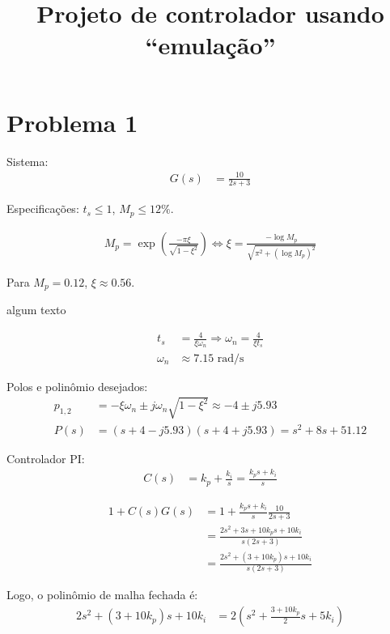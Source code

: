 \documentclass[12pt, a4paper]{article}
\title{Projeto de controlador usando ``emulação''}
\date{}
\begin{document}
	\maketitle

\section{Problema 1}

\newcommand{\Z}[1]{\mathcal{Z}\left\{#1\right\}}
\newcommand{\iZ}[1]{\mathcal{Z}^{-1}\left\{#1\right\}}

Sistema:
\begin{align}
	G(s) &= \frac{10}{2s+3}
\end{align}

Especificações: $t_s\leq 1$, $M_p\leq 12\%$.

\begin{align}
	M_p = \exp\left(\frac{-\pi\xi}{\sqrt{1-\xi^2}}\right) \Leftrightarrow \xi = \frac{-\log M_p}{\sqrt{\pi^2+(\log M_p)^2}}
\end{align}

Para $M_p=0.12$, $\xi\approx 0.56$.

algum texto

\begin{align}
	t_s &= \frac{4}{\xi \omega_n}	\Rightarrow \omega_n = \frac{4}{\xi t_s}\\
	\omega_n &\approx 7.15 \text{ rad/s}
\end{align}

Polos e polinômio desejados:
\begin{align}
	p_{1,2} &= -\xi\omega_n \pm j\omega_n\sqrt{1-\xi^2}\approx -4\pm j5.93\\
	P(s)  &= (s+4-j5.93)(s+4+j5.93) = s^2+8s+51.12
\end{align}

Controlador PI:
\begin{align}
	C(s) &= k_p+\frac{k_i}{s} = \frac{k_ps+k_i}{s}
\end{align}

\begin{align}
	1+C(s)G(s) &= 1 +\frac{k_ps+k_i}{s}\frac{10}{2s+3}\\
	&= \frac{2s^2+3s+10k_ps+10k_i }{s(2s+3)}\\
	&= \frac{2s^2+(3+10k_p)s+10k_i }{s(2s+3)}
\end{align}

Logo, o polinômio de malha fechada é:
\begin{align}
	2s^2+(3+10k_p)s+10k_i &= 2\left(	s^2+\frac{3+10k_p}{2}s+5k_i\right)
\end{align}
\end{document}
